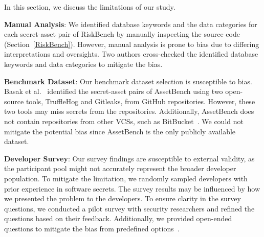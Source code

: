 In this section, we discuss the limitations of our study. 

\textbf{Manual Analysis}: We identified database keywords and the data categories for each secret-asset pair of RiskBench by manually inspecting the source code (Section~\ref{RiskBench}). However, manual analysis is prone to bias due to differing interpretations and oversights. Two authors cross-checked the identified database keywords and data categories to mitigate the bias. 

\textbf{Benchmark Dataset}: Our benchmark dataset selection is susceptible to bias. Basak et al.~\cite{assetharvester} identified the secret-asset pairs of AssetBench using two open-source tools, TruffleHog and Gitleaks, from GitHub repositories. However, these two tools may miss secrets from the repositories. Additionally, AssetBench does not contain repositories from other VCSs, such as BitBucket~\cite{bitbucket}. We could not mitigate the potential bias since AssetBench is the only publicly available dataset.

\textbf{Developer Survey}: Our survey findings are susceptible to external validity, as the participant pool might not accurately represent the broader developer population. To mitigate the limitation, we randomly sampled developers with prior experience in software secrets. The survey results may be influenced by how we presented the problem to the developers. To ensure clarity in the survey questions, we conducted a pilot survey with security researchers and refined the questions based on their feedback. Additionally, we provided open-ended questions to mitigate the bias from predefined options~\cite{tourangeau2000psychology}.

